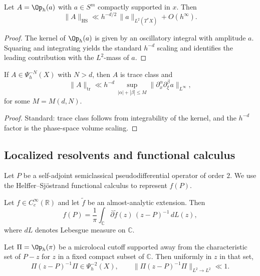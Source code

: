 \begin{lemma}
\label{lem:C.hs}
Let $A=\Op_h(a)$ with $a\in S^m$ compactly supported in $x$.
Then
\[
\|A\|_{\mathrm{HS}}
\ll
h^{-d/2}\,\|a\|_{L^2(T^\ast X)} + O(h^\infty).
\]
\end{lemma}

\begin{proof}
The kernel of $\Op_h(a)$ is given by an oscillatory integral with amplitude $a$.
Squaring and integrating yields the standard $h^{-d}$ scaling and identifies the leading contribution with the
$L^2$-mass of $a$.
\end{proof}

\begin{lemma}
\label{lem:C.trace-class}
If $A\in \Psi_h^{-N}(X)$ with $N>d$, then $A$ is trace class and
\[
\|A\|_{\mathrm{tr}}
\ll
h^{-d}\,\sup_{|\alpha|+|\beta|\le M}\|\partial_x^\alpha\partial_\xi^\beta a\|_{L^\infty},
\]
for some $M=M(d,N)$.
\end{lemma}

\begin{proof}
Standard: trace class follows from integrability of the kernel, and the $h^{-d}$ factor is the phase-space volume
scaling.
\end{proof}

\subsection{Localized resolvents and functional calculus}
\label{subsec:C.resolvent}

Let $P$ be a self-adjoint semiclassical pseudodifferential operator of order $2$.
We use the Helffer--Sj\"ostrand functional calculus to represent $f(P)$.

\begin{proposition}
\label{prop:C.helffer-sjostrand}
Let $f\in C_c^\infty(\mathbb{R})$ and let $\widetilde{f}$ be an almost-analytic extension.
Then
\[
f(P)
=
\frac{1}{\pi}\int_{\mathbb{C}} \bar{\partial}\widetilde{f}(z)\,(z-P)^{-1}\,dL(z),
\]
where $dL$ denotes Lebesgue measure on $\mathbb{C}$.
\end{proposition}

\begin{lemma}
\label{lem:C.resolvent-bound}
Let $\Pi=\Op_h(\pi)$ be a microlocal cutoff supported away from the characteristic set of $P-z$ for $z$ in a fixed
compact subset of $\mathbb{C}$.
Then uniformly in $z$ in that set,
\[
\Pi(z-P)^{-1}\Pi \in \Psi_h^{-2}(X),
\qquad
\|\Pi(z-P)^{-1}\Pi\|_{L^2\to L^2}\ll 1.
\]
\end{lemma}

